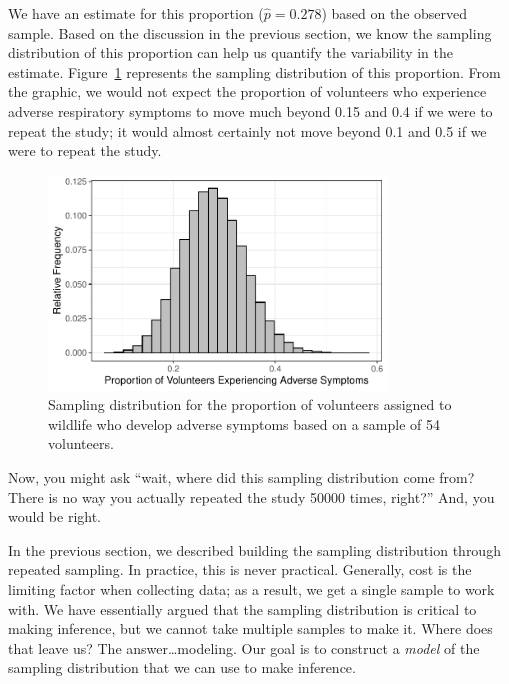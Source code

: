 \documentclass[
  letterpaper,
  DIV=11,
  numbers=noendperiod]{scrreprt}
\theoremstyle{plain}
\theoremstyle{definition}
\theoremstyle{definition}
\theoremstyle{remark}
\begin{document}
We have an estimate for this proportion (\(\widehat{p} = 0.278\)) based
on the observed sample. Based on the discussion in the previous section,
we know the sampling distribution of this proportion can help us
quantify the variability in the estimate.
Figure~\ref{fig-samplingdistns-deepwater-histogram} represents the
sampling distribution of this proportion. From the graphic, we would not
expect the proportion of volunteers who experience adverse respiratory
symptoms to move much beyond 0.15 and 0.4 if we were to repeat the
study; it would almost certainly not move beyond 0.1 and 0.5 if we were
to repeat the study.

\begin{figure}

{\centering \includegraphics[width=0.8\textwidth,height=\textheight]{./images/fig-samplingdistns-deepwater-histogram-1.pdf}

}

\caption{\label{fig-samplingdistns-deepwater-histogram}Sampling
distribution for the proportion of volunteers assigned to wildlife who
develop adverse symptoms based on a sample of 54 volunteers.}

\end{figure}

Now, you might ask ``wait, where did this sampling distribution come
from? There is no way you actually repeated the study 50000 times,
right?'' And, you would be right.

In the previous section, we described building the sampling distribution
through repeated sampling. In practice, this is never practical.
Generally, cost is the limiting factor when collecting data; as a
result, we get a single sample to work with. We have essentially argued
that the sampling distribution is critical to making inference, but we
cannot take multiple samples to make it. Where does that leave us? The
answer\ldots modeling. Our goal is to construct a \emph{model} of the
sampling distribution that we can use to make inference.
\end{document}
